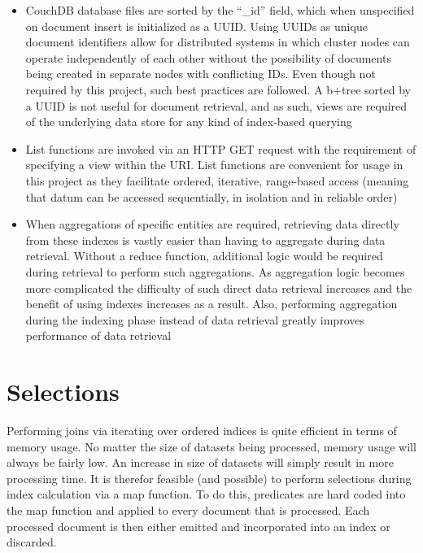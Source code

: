 \begin{itemize}
  \item CouchDB database files are sorted by the ``\_id'' field, which when unspecified on document insert is initialized as a UUID. Using UUIDs as unique document identifiers allow for distributed systems in which cluster nodes can operate independently of each other without the possibility of documents being created in separate nodes with conflicting IDs. Even though not required by this project, such best practices are followed. A b+tree sorted by a UUID is not useful for document retrieval, and as such, views are required of the underlying data store for any kind of index-based querying
  \item List functions are invoked via an HTTP GET request with the requirement of specifying a view within the URI. List functions are convenient for usage in this project as they facilitate ordered, iterative, range-based access (meaning that datum can be accessed sequentially, in isolation and in reliable order)
  \item When aggregations of specific entities are required, retrieving data directly from these indexes is vastly easier than having to aggregate during data retrieval. Without a reduce function, additional logic would be required during retrieval to perform such aggregations. As aggregation logic becomes more complicated the difficulty of such direct data retrieval increases and the benefit of using indexes increases as a result. Also, performing aggregation during the indexing phase instead of data retrieval greatly improves performance of data retrieval
\end{itemize}

\section{Selections}
Performing joins via iterating over ordered indices is quite efficient in terms of memory usage. No matter the size of datasets being processed, memory usage will always be fairly low. An increase in size of datasets will simply result in more processing time. It is therefor feasible (and possible) to perform selections during index calculation via a map function. To do this, predicates are hard coded into the map function and applied to every document that is processed. Each processed document is then either emitted and incorporated into an index or discarded.

